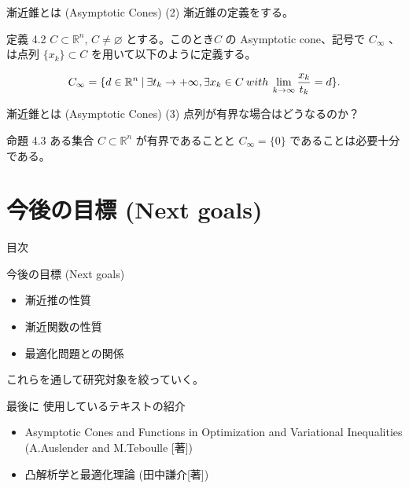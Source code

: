 \documentclass[aspectratio=169, dvipdfmx, 11pt]{beamer} %
\begin{document}
\begin{frame}{漸近錐とは (Asymptotic Cones) (2) }
  漸近錐の定義をする。
  \begin{block}{定義 4.2}
    $C \subset \mathbb{R}^n$, $C \neq \varnothing$ とする。このとき$C$ の Asymptotic cone、記号で $C_\infty$ 、は点列 $\{ x_k \} \subset C$ を用いて以下のように定義する。

    \begin{equation}
      C_\infty = \{ d \in
    \mathbb{R}^n \:|\: \exists t_k \rightarrow +\infty, \exists x_k \in C \:with\: \lim_{k \to \infty} \frac{x_k}{t_k} = d \}. \notag
    \end{equation}
  \end{block}
\end{frame}

\begin{frame}{漸近錐とは (Asymptotic Cones) (3) }
  点列が有界な場合はどうなるのか？
  \begin{block}{命題 4.3}
    ある集合 $C \subset \mathbb{R}^n$ が有界であることと $C_\infty = \{0\}$ であることは必要十分である。
  \end{block}
\end{frame}

\section{今後の目標 (Next goals) }
\begin{frame}{目次}
    \tableofcontents[currentsection]
\end{frame}

\begin{frame}{今後の目標 (Next goals) }
    \begin{itemize}
    \item 漸近推の性質
    \item 漸近関数の性質
    \item 最適化問題との関係
    \end{itemize}

    これらを通して研究対象を絞っていく。
\end{frame}

\begin{frame}{最後に }
  使用しているテキストの紹介
  \begin{itemize}
  \item Asymptotic Cones and Functions in Optimization and Variational Inequalities (A.Auslender and M.Teboulle [著])
  \item 凸解析学と最適化理論 (田中謙介[著])
  \end{itemize}
\end{frame}
\end{document}
